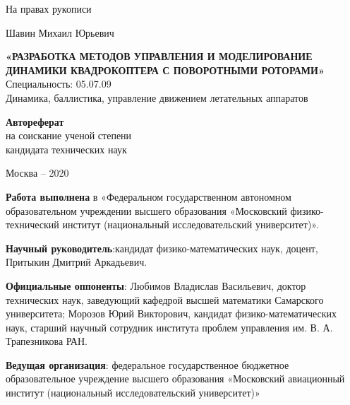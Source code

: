 \thispagestyle{empty}

{
	\vskip 5mm
}

\begin{flushright}
	На правах рукописи
\end{flushright}


{
	\vskip 45mm
}

\begin{center}
	Шавин Михаил Юрьевич
\end{center}
\begin{center} 
	\textbf{«РАЗРАБОТКА МЕТОДОВ УПРАВЛЕНИЯ И МОДЕЛИРОВАНИЕ ДИНАМИКИ КВАДРОКОПТЕРА С ПОВОРОТНЫМИ РОТОРАМИ»} \\
	Специальность: 05.07.09 \\
	Динамика, баллистика, управление движением летательных аппаратов
\end{center}

{
	\vskip 20mm
}

\begin{center} 
	\textbf{Автореферат} \\
	на соискание ученой степени \\
	кандидата технических наук
\end{center}


{
	\vskip 55mm
}

\begin{center} 
	Москва -- 2020
\end{center}

\newpage %

\textbf{Работа выполнена} в «Федеральном государственном автономном образовательном учреждении высшего образования «Московский физико-технический институт (национальный исследовательский университет)».

\textbf{Научный руководитель}:кандидат физико-математических наук, доцент, Притыкин Дмитрий Аркадьевич.

\textbf{Официальные оппоненты}: Любимов Владислав Васильевич, доктор технических наук, заведующий кафедрой высшей математики Самарского университета;
Морозов Юрий Викторович, кандидат физико-математических наук, старший научный сотрудник института проблем управления им. В. А. Трапезникова РАН.

\textbf{Ведущая организация}:
федеральное государственное бюджетное образовательное учреждение высшего образования «Московский авиационный институт (национальный исследовательский университет)»\\


